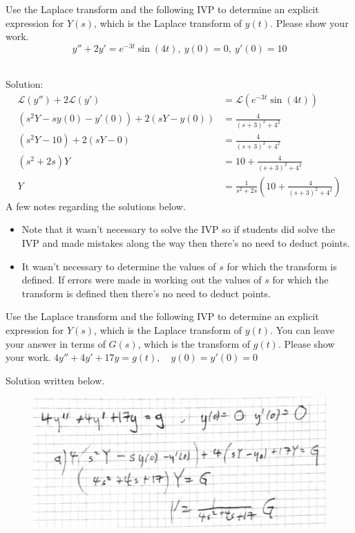 \ifnum {}
    \question[6] Use the Laplace transform and the following IVP to determine an explicit expression for $Y(s)$, which is the Laplace transform of $y(t)$. Please show your work. 
    $$y''+ 2y'  = e^{-3t}\sin(4t), \ y(0) = 0, \ y'(0) = 10$$
    \ifnum {} {\color{DarkBlue} \\ Solution:
    \begin{align}
        \mathcal L(y'') + 2\mathcal L(y') &= \mathcal{L}(e^{-3t}\sin(4t))\\ 
        (s^2 Y - sy(0) - y'(0)) + 2(sY - y(0))  &= \frac{4}{(s+3)^2 + 4^2} \\
        (s^2 Y - 10) + 2(sY - 0)  &= \frac{4}{(s+3)^2 + 4^2} \\
        (s^2 + 2s )Y  &= 10 + \frac{4}{(s+3)^2 + 4^2} \\
        Y &= \frac{1}{s^2 + 2s } \left( 10 + \frac{4}{(s+3)^2 + 4^2} \right) 
    \end{align}       
    A few notes regarding the solutions below. 
    \begin{itemize}
        \item  Note that it wasn't necessary to solve the IVP so if students did solve the IVP and made mistakes along the way then there's no need to deduct points. 
        \item It wasn't necessary to determine the values of $s$ for which the transform is defined. If errors were made in working out the values of $s$ for which the transform is defined then there's no need to deduct points. 
    \end{itemize}    
    } 
    \else 
    \vfill
    \fi         
\fi







\ifnum {}
    \question[6] Use the Laplace transform and the following IVP to determine an explicit expression for $Y(s)$, which is the Laplace transform of $y(t)$. You can leave your answer in terms of $G(s)$, which is the transform of $g(t)$. Please show your work. 
    $4y''+4y'+17y=g(t), \quad y(0) = y'(0) = 0$
    \ifnum {} {\color{DarkBlue} Solution written below. 
        \begin{figure}[h]
        \centering
        \includegraphics[width=14cm]{Images/ImgLaplaceG.png}
        \end{figure}  
    } 
    \else 
    \vfill
    \fi
\fi     
